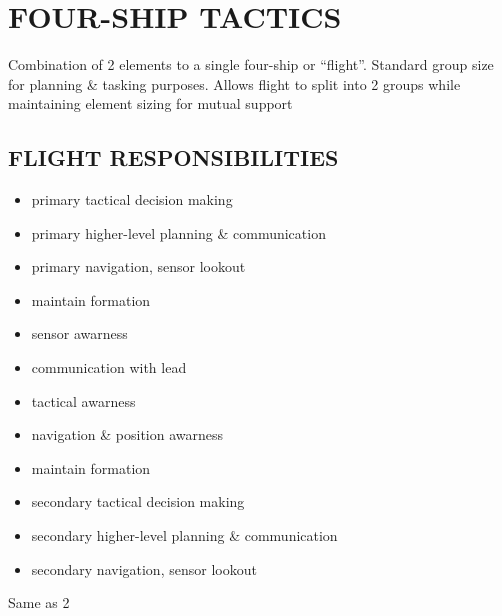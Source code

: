 \section{FOUR-SHIP TACTICS}
\label{sec:ttp_aa:tactics_4ship}

\begin{tcoloritemize}
    Combination of 2 elements to a single four-ship or ``flight''.
    Standard group size for planning \& tasking purposes. 
    Allows flight to split into 2 groups while maintaining element sizing for mutual support
\end{tcoloritemize}

\subsection{FLIGHT RESPONSIBILITIES}

\begin{tcoloritemize}
    \begin{itemize}
        \item primary tactical decision making
        \item primary higher-level planning \& communication
        \item primary navigation, sensor lookout
    \end{itemize}
    
    \blueitem[2 --- Wingman]
    \begin{itemize}
        \item maintain formation
        \item sensor awarness
        \item communication with lead
        \item tactical awarness
        \item navigation \& position awarness
    \end{itemize}

    \begin{itemize}
        \item maintain formation
        \item secondary tactical decision making
        \item secondary higher-level planning \& communication
        \item secondary navigation, sensor lookout
    \end{itemize}

    \blueitem[4 --- Wingman]
    Same as 2

\end{tcoloritemize}

